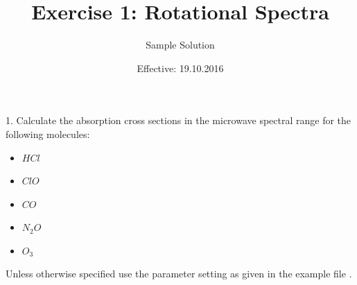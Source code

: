 \documentclass[paper=a4, fontsize=11pt]{scrartcl}
\title{Exercise 1: Rotational Spectra}
\author{Sample Solution}
\date{Effective: 19.10.2016}
\begin{document}
\maketitle

1. Calculate the absorption cross sections in the microwave spectral range for the
following molecules:
\begin{itemize}
    \item $HCl$
    \item $ClO$
    \item $CO$
    \item $N_2O$
    \item $O_3$
\end{itemize}
Unless otherwise specified use the parameter setting as given in the example
file .

\end{document}
